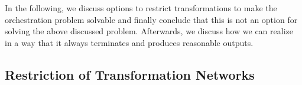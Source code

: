 In the following, we discuss options to restrict transformations to make the orchestration problem solvable and finally conclude that this is not an option for solving the above discussed problem.
Afterwards, we discuss how we can realize  in a way that it always terminates and produces reasonable outputs.







\subsection{Restriction of Transformation Networks}
\label{chap:orchestration:decidability:restriction}

